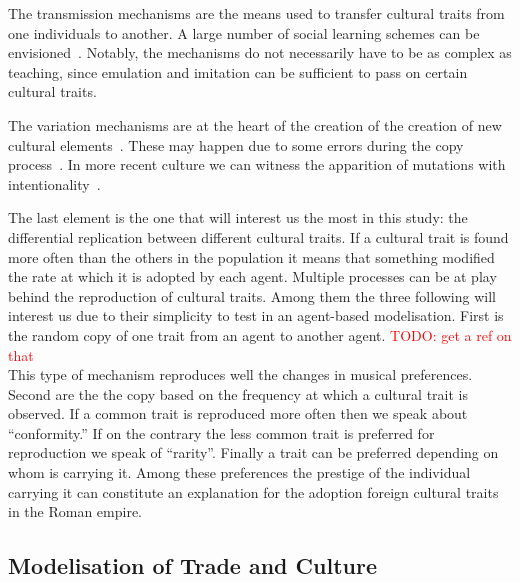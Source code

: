 \documentclass{wscpaperproc}
\newcommand{\memo}[2]{\textcolor{#1}{#2}}
\newcommand{\todo}[1]{\memo{red}{TODO: #1\\}}
\begin{document}
The transmission mechanisms are the means used to transfer cultural traits from one individuals to another. A large number of social learning schemes can be envisioned~\cite{heyes_social_1994}. Notably, the mechanisms do not necessarily have to be as complex as teaching, since emulation and imitation can be sufficient to pass on certain cultural traits.

The variation mechanisms are at the heart of the creation of the creation of new cultural elements~\cite{obrien_variation_1990}. These may happen due to some errors during the copy process~\cite{schillinger_copying_2014}. In more recent culture we can witness the apparition of mutations with intentionality~\cite{ziman_technological_2003}.

The last element is the one that will interest us the most in this study: the differential replication between different cultural traits. If a cultural trait is found more often than the others in the population it means that something modified the rate at which it is adopted by each agent. 
Multiple processes can be at play behind the reproduction of cultural traits. Among them the three following will interest us due to their simplicity to test in an agent-based modelisation. First is the random copy of one trait from an agent to another agent. 
\todo{get a ref on that}
This type of mechanism reproduces well the changes in musical preferences. Second are the the copy based on the frequency at which a cultural trait is observed. If a common trait is reproduced more often then we speak about ``conformity.'' If on the contrary the less common trait is preferred for reproduction we speak of ``rarity''. Finally a trait can be preferred depending on whom is carrying it. Among these preferences the prestige of the individual carrying it can constitute an explanation for the adoption foreign cultural traits in the Roman empire.


\subsection{Modelisation of Trade and Culture}
\end{document}
